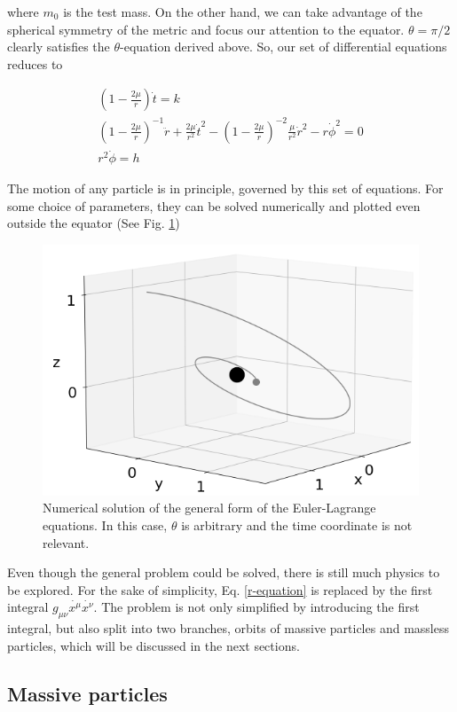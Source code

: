 \documentclass[letterpaper,11pt,onecolumn]{article}
\begin{document}
where $m_0$ is the test mass. On the other hand, we can take advantage of the spherical symmetry of the metric and focus our attention to the equator. $\theta = \pi / 2$ clearly satisfies the $\theta$-equation derived above. So, our set of differential equations reduces to 

    \begin{eqnarray}
        \left( 1 - \frac{2 \mu}{r} \right) \dot{t} = k \label{t-equation} \\
        \left( 1 - \frac{2 \mu}{r} \right)^{-1} \ddot{r} + \frac{2\mu}{r^2} \dot{t}^2 - \left( 1 - \frac{2 \mu}{r} \right)^{-2} \frac{\mu}{r^2} \dot{r}^2 - r\dot{\phi}^2  = 0 \label{r-equation} \\
        r^2 \dot{\phi} = h \label{phi-equation}
    \end{eqnarray}

The motion of any particle is in principle, governed by this set of equations. For some choice of parameters, they can be solved numerically and plotted even outside the equator (See Fig. \ref{fig:general_orbit})

\begin{figure}[h!]
    \centering
    \includegraphics[width=0.6\linewidth]{Presentations/Images/2_gen_obit1.png}
    \caption{Numerical solution of the general form of the Euler-Lagrange equations. In this case, $\theta$ is arbitrary and the time coordinate is not relevant.}
    \label{fig:general_orbit}
\end{figure}

Even though the general problem could be solved, there is still much physics to be explored. For the sake of simplicity, Eq. \ref{r-equation} is replaced by the first integral $g_{\mu \nu} \dot{x^\mu} \dot{x^\nu}$. The problem is not only simplified by introducing the first integral, but also split into two branches, orbits of massive particles and massless particles, which will be discussed in the next sections.

\subsection{Massive particles}
\end{document}
